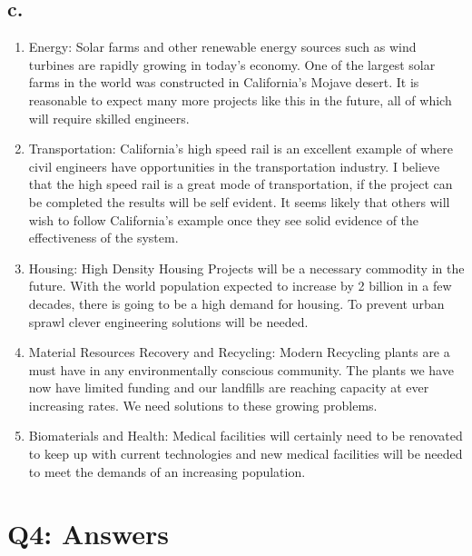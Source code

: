 \documentclass[12pt]{article}
\renewcommand{\=}[1]{\stackrel{#1}{=}} %
\theoremstyle{definition}
\theoremstyle{remark}
\begin{document}
\subsection{c.}
\begin{enumerate}
	\item Energy: Solar farms and other renewable energy sources such as wind turbines are rapidly growing in today's economy. One of the largest solar farms in the world was constructed in California's Mojave desert. It is reasonable to expect many more projects like this in the future, all of which will require skilled engineers.
	
	\item Transportation: California's high speed rail is an excellent example of where civil engineers have opportunities in the transportation industry. I believe that the high speed rail is a great mode of transportation, if the project can be completed the results will be self evident. It seems likely that others will wish to follow California's example once they see solid evidence of the effectiveness of the system.
	
	\item Housing: High Density Housing Projects will be a necessary commodity in the future. With the world population expected to increase by 2 billion in a few decades, there is going to be a high demand for housing. To prevent urban sprawl clever engineering solutions will be needed.
	
	\item Material Resources Recovery and Recycling: Modern Recycling plants are a must have in any environmentally conscious community. The plants we have now have limited funding and our landfills are reaching capacity at ever increasing rates. We need solutions to these growing problems.
	
	\item Biomaterials and Health: Medical facilities will certainly need to be renovated to keep up with current technologies and new medical facilities will be needed to meet the demands of an increasing population.
\end{enumerate}



\section{Q4: Answers}
\end{document}
